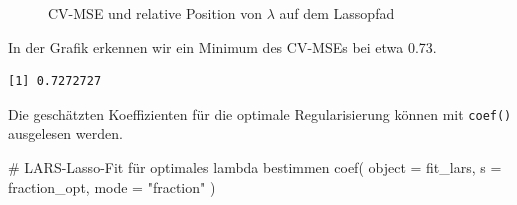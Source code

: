 \documentclass[
  a4paper,
  DIV=11,
  oneside]{scrreprt}
\newenvironment{Shaded}{\begin{snugshade}}{\end{snugshade}}
\newcommand{\AttributeTok}[1]{\textcolor[rgb]{0.40,0.45,0.13}{#1}}
\newcommand{\CommentTok}[1]{\textcolor[rgb]{0.37,0.37,0.37}{#1}}
\newcommand{\FunctionTok}[1]{\textcolor[rgb]{0.28,0.35,0.67}{#1}}
\newcommand{\NormalTok}[1]{\textcolor[rgb]{0.00,0.23,0.31}{#1}}
\newcommand{\OtherTok}[1]{\textcolor[rgb]{0.00,0.23,0.31}{#1}}
\newcommand{\SpecialCharTok}[1]{\textcolor[rgb]{0.37,0.37,0.37}{#1}}
\newcommand{\StringTok}[1]{\textcolor[rgb]{0.13,0.47,0.30}{#1}}
\begin{document}
\begin{figure}[t]


\caption{\label{fig-larscv}CV-MSE und relative Position von \(\lambda\)
auf dem Lassopfad}

\end{figure}%

In der Grafik erkennen wir ein Minimum des CV-MSEs bei etwa 0.73.

\begin{Shaded}
\end{Shaded}

\begin{verbatim}
[1] 0.7272727
\end{verbatim}

Die geschätzten Koeffizienten für die optimale Regularisierung können
mit \texttt{coef()} ausgelesen werden.

\begin{Shaded}
\begin{Highlighting}[]
\CommentTok{\# LARS{-}Lasso{-}Fit für optimales lambda bestimmen}
\FunctionTok{coef}\NormalTok{(}
  \AttributeTok{object =}\NormalTok{ fit\_lars, }
  \AttributeTok{s =}\NormalTok{ fraction\_opt, }
  \AttributeTok{mode =} \StringTok{"fraction"}
\NormalTok{)}
\end{Highlighting}
\end{Shaded}
\end{document}
